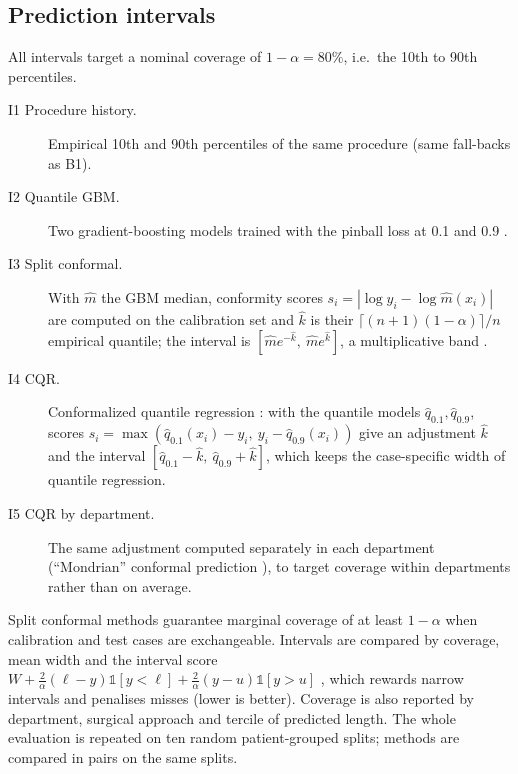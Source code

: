 \documentclass[11pt,a4paper]{article}
\begin{document}
\subsection{Prediction intervals}
All intervals target a nominal coverage of $1-\alpha = 80\%$, i.e.\ the 10th to 90th percentiles.
\begin{description}
  \item[I1 Procedure history.] Empirical 10th and 90th percentiles of the same procedure (same fall-backs as B1).
  \item[I2 Quantile GBM.] Two gradient-boosting models trained with the pinball loss at 0.1 and 0.9 \cite{koenker1978}.
  \item[I3 Split conformal.] With $\hat m$ the GBM median, conformity scores $s_i=|\log y_i-\log\hat m(x_i)|$ are computed on
        the calibration set and $\hat k$ is their $\lceil (n+1)(1-\alpha)\rceil/n$ empirical quantile; the interval is
        $[\hat m e^{-\hat k},\ \hat m e^{\hat k}]$, a multiplicative band \cite{vovk2005,angelopoulos2021}.
  \item[I4 CQR.] Conformalized quantile regression \cite{romano2019}: with the quantile models $\hat q_{0.1},\hat q_{0.9}$,
        scores $s_i=\max(\hat q_{0.1}(x_i)-y_i,\ y_i-\hat q_{0.9}(x_i))$ give an adjustment $\hat k$ and the interval
        $[\hat q_{0.1}-\hat k,\ \hat q_{0.9}+\hat k]$, which keeps the case-specific width of quantile regression.
  \item[I5 CQR by department.] The same adjustment computed separately in each department (``Mondrian'' conformal
        prediction \cite{vovk2005}), to target coverage within departments rather than on average.
\end{description}
Split conformal methods guarantee marginal coverage of at least $1-\alpha$ when calibration and test cases are
exchangeable. Intervals are compared by coverage, mean width and the interval score
$W + \tfrac{2}{\alpha}(\ell-y)\mathbb{1}[y<\ell] + \tfrac{2}{\alpha}(y-u)\mathbb{1}[y>u]$ \cite{gneiting2007}, which rewards
narrow intervals and penalises misses (lower is better). Coverage is also reported by department, surgical approach and
tercile of predicted length. The whole evaluation is repeated on ten random patient-grouped splits; methods are compared
in pairs on the same splits.
\end{document}
